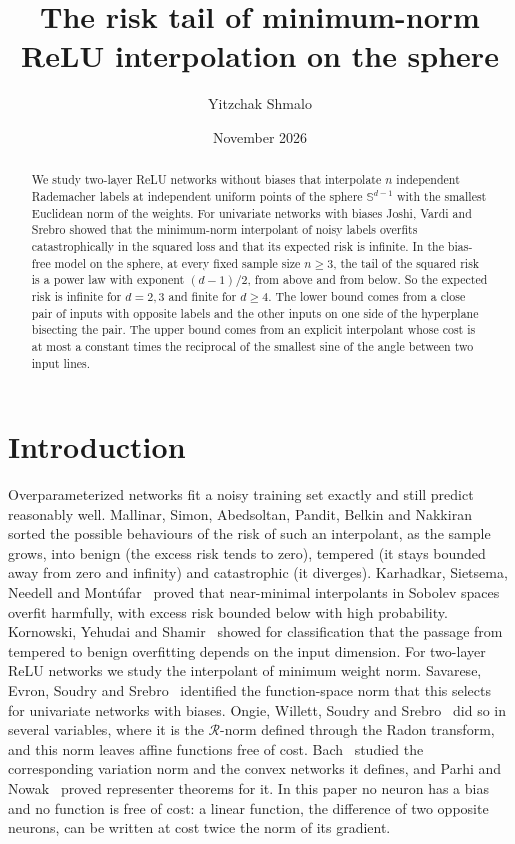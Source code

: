 \documentclass[11pt]{amsart}
\title[The risk tail of minimum-norm ReLU interpolation]{The risk tail of minimum-norm ReLU interpolation on the sphere}
\author{Yitzchak Shmalo}
\date{November 2026}
\theoremstyle{remark}
\numberwithin{equation}{section}
\newcommand{\Sph}{\mathbb{S}^{d-1}}
\begin{document}
\begin{abstract}
We study two-layer ReLU networks without biases that interpolate $n$ independent Rademacher labels at independent uniform points of the sphere $\Sph$ with the smallest Euclidean norm of the weights. For univariate networks with biases Joshi, Vardi and Srebro showed that the minimum-norm interpolant of noisy labels overfits catastrophically in the squared loss and that its expected risk is infinite. In the bias-free model on the sphere, at every fixed sample size $n\ge3$, the tail of the squared risk is a power law with exponent $(d-1)/2$, from above and from below. So the expected risk is infinite for $d=2,3$ and finite for $d\ge4$. The lower bound comes from a close pair of inputs with opposite labels and the other inputs on one side of the hyperplane bisecting the pair. The upper bound comes from an explicit interpolant whose cost is at most a constant times the reciprocal of the smallest sine of the angle between two input lines.
\end{abstract}
\maketitle

\section{Introduction}\label{sec:intro}
Overparameterized networks fit a noisy training set exactly and still predict reasonably well. Mallinar, Simon, Abedsoltan, Pandit, Belkin and Nakkiran~\cite{MSAPBN} sorted the possible behaviours of the risk of such an interpolant, as the sample grows, into benign (the excess risk tends to zero), tempered (it stays bounded away from zero and infinity) and catastrophic (it diverges). Karhadkar, Sietsema, Needell and Mont\'ufar~\cite{KSNM} proved that near-minimal interpolants in Sobolev spaces overfit harmfully, with excess risk bounded below with high probability. Kornowski, Yehudai and Shamir~\cite{KYS} showed for classification that the passage from tempered to benign overfitting depends on the input dimension. For two-layer ReLU networks we study the interpolant of minimum weight norm. Savarese, Evron, Soudry and Srebro~\cite{SESS} identified the function-space norm that this selects for univariate networks with biases. Ongie, Willett, Soudry and Srebro~\cite{OWSS} did so in several variables, where it is the $\mathcal R$-norm defined through the Radon transform, and this norm leaves affine functions free of cost. Bach~\cite{Bach} studied the corresponding variation norm and the convex networks it defines, and Parhi and Nowak~\cite{PN} proved representer theorems for it. In this paper no neuron has a bias and no function is free of cost: a linear function, the difference of two opposite neurons, can be written at cost twice the norm of its gradient.
\end{document}
